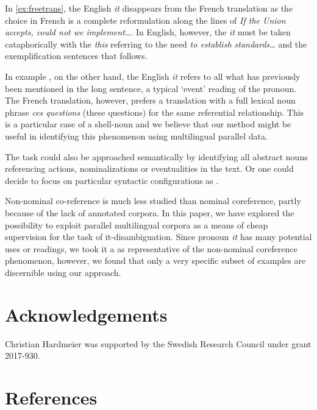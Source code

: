 \documentclass[10pt, a4paper]{article}
\begin{document}
In \ref{ex:freetrans}, the English \textit{it} disappears from the 
French translation as the choice in French is a complete reformulation along the 
lines of \textit{If the Union accepts, could not we implement\ldots}. In 
English, however, the \textit{it} must be taken cataphorically with the 
\textit{this} referring to the need \textit{to establish standards\ldots} and 
the exemplification sentences that follows. 

In example \label{ex:shellnoun}, on the other hand, the English \textit{it} 
refers to all what has previously been mentioned in the long sentence, a typical 
`event' reading of the pronoun. The French translation, however, prefers a 
translation with a full lexical noun phrase \textit{ces questions} (these 
questions) for the same referential 
relationship. This is a particular case of a shell-noun \cite{kolhatkar-
etal-2013-interpreting} and we believe that our method might be useful in identifying this phenomenon using multilingual parallel data. 

The task could also be approached semantically by identifying all abstract
nouns referencing actions, nominalizations or eventualities in the text. Or one
could decide to focus on particular syntactic configurations as
.

Non-nominal co-reference is much less studied than nominal coreference, partly
because of the lack of annotated corpora. In this paper, we have explored the
possibility to exploit parallel multilingual corpora as a means of cheap
supervision for the task of it-disambiguation. Since pronoun \textit{it} has many
potential uses or readings, we took it a as representative of the non-nominal
coreference phenomenon, however, we found that only a very specific subset of examples are discernible using our approach. 

%
%
%
\section{Acknowledgements}
Christian Hardmeier was supported by the Swedish Research Council under grant 2017-930.
%
%
\section{References}

 


\end{document}
